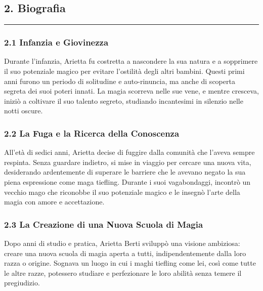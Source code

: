 \subsection{2. Biografia}\label{biografia}

\begin{center}\rule{0.5\linewidth}{0.5pt}\end{center}

\subsubsection{\texorpdfstring{2.1 \textbf{Infanzia e
Giovinezza}}{2.1 Infanzia e Giovinezza}}\label{infanzia-e-giovinezza}

Durante l'infanzia, Arietta fu costretta a nascondere la sua natura e a
sopprimere il suo potenziale magico per evitare l'ostilità degli altri
bambini. Questi primi anni furono un periodo di solitudine e
auto-rinuncia, ma anche di scoperta segreta dei suoi poteri innati. La
magia scorreva nelle sue vene, e mentre cresceva, iniziò a coltivare il
suo talento segreto, studiando incantesimi in silenzio nelle notti
oscure.

\subsubsection{\texorpdfstring{2.2 \textbf{La Fuga e la Ricerca della
Conoscenza}}{2.2 La Fuga e la Ricerca della Conoscenza}}\label{la-fuga-e-la-ricerca-della-conoscenza}

All'età di sedici anni, Arietta decise di fuggire dalla comunità che
l'aveva sempre respinta. Senza guardare indietro, si mise in viaggio per
cercare una nuova vita, desiderando ardentemente di superare le barriere
che le avevano negato la sua piena espressione come maga tiefling.
Durante i suoi vagabondaggi, incontrò un vecchio mago che riconobbe il
suo potenziale magico e le insegnò l'arte della magia con amore e
accettazione.

\subsubsection{\texorpdfstring{2.3 \textbf{La Creazione di una Nuova
Scuola di
Magia}}{2.3 La Creazione di una Nuova Scuola di Magia}}\label{la-creazione-di-una-nuova-scuola-di-magia}

Dopo anni di studio e pratica, Arietta Berti sviluppò una visione
ambiziosa: creare una nuova scuola di magia aperta a tutti,
indipendentemente dalla loro razza o origine. Sognava un luogo in cui i
maghi tiefling come lei, così come tutte le altre razze, potessero
studiare e perfezionare le loro abilità senza temere il pregiudizio.

